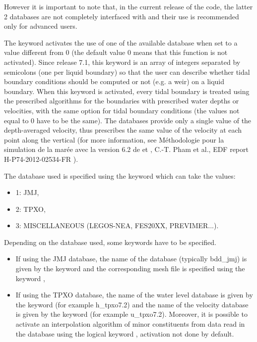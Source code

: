 However it is important to note that, in the current release of the code, the
latter 2 databases are not completely interfaced with  and their use
is recommended only for advanced users.

The keyword  activates the use of
one of the available database when set to a value different from 0
(the default value 0 means that this function is not activated).
Since release 7.1, this keyword is an array of integers separated by semicolons
(one per liquid boundary) so that the user can describe whether tidal boundary
conditions should be computed or not (e.g. a weir) on a liquid boundary.
When this keyword is activated, every tidal
boundary is treated using the prescribed algorithms for the boundaries with
prescribed water depths or velocities, with the same option for tidal boundary
conditions (the values not equal to 0 have to be the same).
The databases provide only a single value of the
depth-averaged velocity, thus  prescribes the same value of the
velocity at each point along the vertical (for more information, see
Méthodologie pour la simulation de la marée avec la version 6.2 de 
et , C.-T. Pham et al., EDF report H-P74-2012-02534-FR
\cite{Pham2012}).

The database used is specified using the keyword  which
can take the values:

\begin{itemize}
\item 1: JMJ,

\item 2: TPXO,

\item 3: MISCELLANEOUS (LEGOS-NEA, FES20XX, PREVIMER...).
\end{itemize}

Depending on the database used, some keywords have to be specified.

\begin{itemize}
\item If using the JMJ database, the name of the database (typically bdd\_jmj)
is given by the keyword  and the corresponding
mesh file is specified using the keyword ,

\item If using the TPXO database, the name of the water level database is given
by the keyword  (for example h\_tpxo7.2) and
the name of the velocity database is given by the keyword  (for example u\_tpxo7.2). Moreover, it is possible to
activate an interpolation algorithm of minor constituents from data read in the
database using the logical keyword ,
activation not done by default.
\end{itemize}

